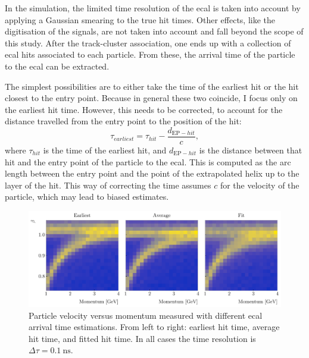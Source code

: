 In the simulation, the limited time resolution of the \gls{ecal} is taken into account by applying a Gaussian smearing to the true hit times. Other effects, like the digitisation of the signals, are not taken into account and fall beyond the scope of this study. After the track-cluster association, one ends up with a collection of \gls{ecal} hits associated to each particle. From these, the arrival time of the particle to the \gls{ecal} can be extracted.

The simplest possibilities are to either take the time of the earliest hit or the hit closest to the entry point. Because in general these two coincide, I focus only on the earliest hit time. However, this needs to be corrected, to account for the distance travelled from the entry point to the position of the hit:
\begin{equation}\label{8.22}
	\tau_{earliest} = \tau_{hit} - \frac{d_{\mathrm{EP}-hit}}{c},
\end{equation}
where $\tau_{hit}$ is the time of the earliest hit, and $d_{\mathrm{EP}-hit}$ is the distance between that hit and the entry point of the particle to the \gls{ecal}. This is computed as the arc length between the entry point and the point of the extrapolated helix up to the layer of the hit. This way of correcting the time assumes $c$ for the velocity of the particle, which may lead to biased estimates.

\begin{figure}[t]
	\centering
	\includegraphics[width=.99\linewidth]{Images/GArSoft_PID/tof/beta_vs_momentum_comparison_delta_0.1.pdf}
	\caption[Particle velocity versus momentum measured with different \gls{ecal} arrival time estimations.]{Particle velocity versus momentum measured with different \gls{ecal} arrival time estimations. From left to right: earliest hit time, average hit time, and fitted hit time. In all cases the time resolution is $\Delta \tau = 0.1 ~ \mathrm{ns}$.}
	\label{fig:tof_beta_comp}
\end{figure}

